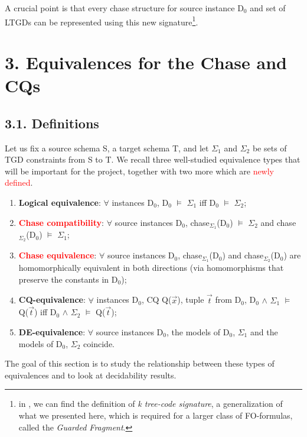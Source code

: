 \documentclass[11pt, a4paper, dvipsnames]{article}
\begin{document}
A crucial point is that every chase structure for source instance D$_{0}$ and set of LTGDs can be represented using this new signature\footnote{in \cite{decidable}, we can find the definition of \textit{k tree-code signature}, a generalization of what we presented here, which is required for a larger class of FO-formulas, called the \textit{Guarded Fragment}.}. 

\newpage

\section{3. Equivalences for the Chase and CQs}
\subsection{3.1. Definitions}
Let us fix a source schema S, a target schema T, and let $\Sigma_{1}$ and $\Sigma_{2}$ be sets of TGD constraints from S to T. We recall three well-studied \cite{equivalence} equivalence types that will be important for the project, together with two more which are \textcolor{red}{newly defined}. 
\begin{enumerate}
	\item \textbf{Logical equivalence}: $\forall$ instances D$_{0}$, D$_{0}$ $\vDash$ $\Sigma_{1}$ iff D$_{0}$ $\vDash$ $\Sigma_{2}$;
	\item \textcolor{red}{\textbf{Chase compatibility}}: $\forall$ source instances D$_{0}$, chase$_{\Sigma_{1}}$(D$_{0}$) $\vDash$ $\Sigma_{2}$ and \newline chase$_{\Sigma_{2}}$(D$_{0}$) $\vDash$ $\Sigma_{1}$;
	\item \textcolor{red}{\textbf{Chase equivalence}}: $\forall$ source instances D$_{0}$, chase$_{\Sigma_{1}}$(D$_{0}$) and chase$_{\Sigma_{2}}$(D$_{0}$) are homomorphically equivalent in both directions (via homomorphisms that preserve the constants in D$_{0}$);
	\item \textbf{CQ-equivalence}: $\forall$ instances D$_{0}$, CQ Q($\vec{x}$), tuple $\vec{t}$ from D$_{0}$, D$_{0}$ $\wedge$ $\Sigma_{1}$ $\vDash$ Q($\vec{t}$) iff D$_{0}$ $\wedge$ $\Sigma_{2}$ $\vDash$ Q($\vec{t}$);
	\item \textbf{DE-equivalence}: $\forall$ source instances D$_{0}$, the models of D$_{0}$, $\Sigma_{1}$ and the models of D$_{0}$, $\Sigma_{2}$ coincide.
\end{enumerate}
The goal of this section is to study the relationship between these types of equivalences and to look at decidability results.
\end{document}
